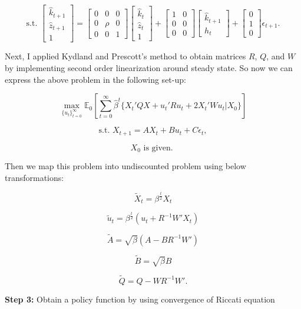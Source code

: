 \documentclass{article}
\begin{document}
	 $$\text{s.t. } \begin{bmatrix} \hat{k}_{t+1} \\ \hat{z}_{t+1} \\ 1  \end{bmatrix} = \begin{bmatrix} 0 & 0 & 0 \\ 0 & \rho & 0 \\ 0 & 0 & 1  \end{bmatrix}\begin{bmatrix} \hat{k}_{t} \\ \hat{z}_{t} \\ 1  \end{bmatrix} + \begin{bmatrix} 1 & 0 \\ 0 & 0 \\ 0 & 0  \end{bmatrix}\begin{bmatrix} \hat{k}_{t+1} \\ h_{t}  \end{bmatrix} + \begin{bmatrix} 0 \\ 1 \\ 0 \end{bmatrix}\epsilon_{t+1}.$$
	 
	 Next, I applied Kydland and Prescott's method to obtain matrices $R$, $Q$, and $W$ by implementing second order linearization around steady state. So now we can express the above problem in the following set-up:
	 
	 $$\max_{ \{u_{t} \}_{t=0}^{\infty}} \mathds{E}_{0}\left[ \sum_{t=0}^{\infty}\hat{\beta}^{t} \{ X_{t}'QX + u_{t}'Ru_{t} + 2X_{t}'Wu_{t} | X_{0} \} \right]$$
	 
	 $$\text{s.t. } X_{t+1} = AX_{t} + Bu_{t} + C\epsilon_{t},$$
	 
	 $$X_{0} \text{ is given. }$$
	 
	 Then we map this problem into undiscounted problem using below transformations:
	 
	 $$\tilde{X}_{t} = \beta^{\frac{t}{2}}X_{t}$$
	 
	 $$\tilde{u}_{t} = \beta^{\frac{t}{2}}(u_{t} + R^{-1}W'X_{t})$$
	 
	 $$\tilde{A} = \sqrt{\beta}(A - BR^{-1}W')$$
	 
	 $$\tilde{B} = \sqrt{\beta}B$$
	 
	 $$\tilde{Q} = Q - WR^{-1}W'.$$
	 
	 \textbf{Step 3:} Obtain a policy function by using convergence of Riccati equation \\
	 
\end{document}
